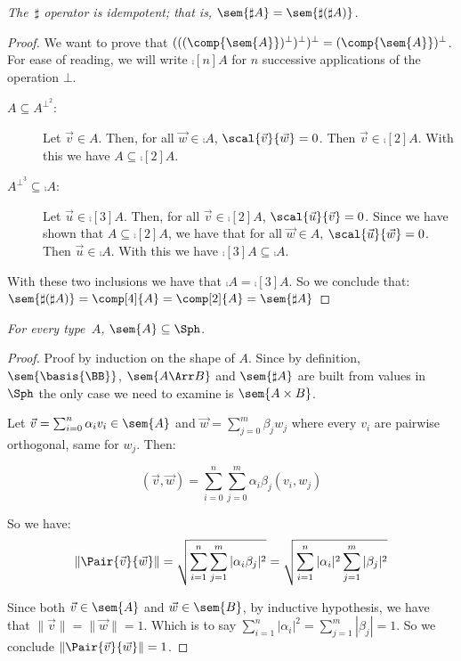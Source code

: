 \begin{restatetheorem}
  \itshape
  The~$\sharp$ operator is idempotent; that is,
  $\sem{\sharp A} = \sem{\sharp(\sharp A)}$.
\end{restatetheorem}
\begin{proof}
  We want to prove that $(((\comp{\sem{A}})^\bot)^\bot)^\bot = (\comp{\sem{A}})^\bot$. For ease of reading, we will write $\comp[n]{A}$ for $n$ successive applications of the operation $\bot$.

  \begin{description}
    \item[$A\subseteq A^{\bot^2}$:] Let $\vec{v}\in A$. Then, for all $\vec{w}\in\comp{A}$, $\scal{\vec{v}}{\vec{w}} = 0$. Then $\vec{v}\in\comp[2]{A}$. With this we have $A\subseteq\comp[2]{A}$.
    
    \item[$A^{\bot^3}\subseteq \comp{A}$:] Let $\vec{u}\in \comp[3]{A}$. Then, for all $\vec{v}\in\comp[2]{A}$, $\scal{\vec u}{\vec v} = 0$. Since we have shown that $A\subseteq \comp[2]{A}$, we have that for all $\vec{w}\in A$, $\scal{\vec u}{\vec w} = 0$. Then $\vec u\in\comp{A}$. With this we have $\comp[3]{A}\subseteq \comp{A}$.
  \end{description}

  With these two inclusions we have that $\comp{A}=\comp[3]{A}$. So we conclude that: $\sem{\sharp(\sharp A)} = \comp[4]{A} = \comp[2]{A} = \sem{\sharp A}$ \qedhere
\end{proof}

\begin{restatetheorem}
  \itshape
  For every type~$A$, $\sem{A}\subseteq\Sph$.
\end{restatetheorem}

\begin{proof}
  Proof by induction on the shape of $A$. Since by definition, $\sem{\basis{\BB}}$, $\sem{A\Arr B}$ and $\sem{\sharp{A}}$ are built from values in $\Sph$ the only case we need to examine is $\sem{A\times B}$.
  
  Let $\vec v = \sum_{i=0}^{n} \alpha_i v_i \in\sem{A}$ and $\vec w = \sum_{j=0}^{m} \beta_j w_j$ where every $v_i$ are pairwise orthogonal, same for $w_j$. Then:
     
  \[(\vec v, \vec w) = \sum_{i=0}^{n} \sum_{j=0}^{m} \alpha_i\beta_j (v_i,w_j)\]
  
  So we have: 
  \[\|\Pair{\vec v}{\vec w}\| = \sqrt{\sum_{i=1}^n\sum_{j=1}^{m} |\alpha_i\beta_j|^2} = \sqrt{\sum_{i=1}^n |\alpha_i|^2 \sum_{j=1}^{m} |\beta_j|^2}\]

  Since both $\vec v\in\sem{A}$ and $\vec w\in\sem{B}$, by inductive hypothesis, we have that $\|\vec v\| = \| \vec w \| = 1$. Which is to say $\sum_{i=1}^{n} |\alpha_i|^2 = \sum_{j=1}^{m} |\beta_j| = 1$. So we conclude $\|\Pair{\vec{v}}{\vec{w}}\| = 1$.
  \qedhere
\end{proof}

